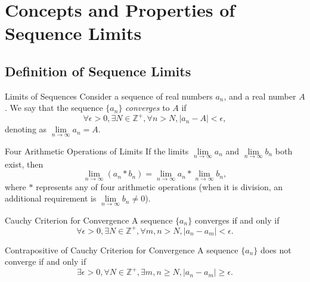 
\section{Concepts and Properties of Sequence Limits}

\subsection{Definition of Sequence Limits}

\begin{definition}{Limits of Sequences}{}
  Consider a sequence of real numbers $a_n$, and a real number $A$.
  We say that the sequence $\{a_n\}$ \emph{converges} to $A$ if
  \begin{equation}
    \forall \epsilon > 0, \exists N \in \mathbb{Z}^+, \forall n > N, |a_n - A| < \epsilon,
  \end{equation}
  denoting as $\lim \limits _{n \rightarrow \infty}a_n = A$.
\end{definition}

\begin{proposition}{Four Arithmetic Operations of Limits}{}
  If the limits $\lim \limits _{n \rightarrow \infty} a_n$ and $\lim \limits _{n \rightarrow \infty} b_n$
  both exist, then
  \begin{equation}
    \lim \limits _{n \rightarrow \infty} (a_n \ast b_n) = \lim \limits _{n \rightarrow \infty} a_n \ast \lim \limits _{n \rightarrow \infty} b_n,
  \end{equation}
  where $\ast$ represents any of four arithmetic operations
  (when it is division, an additional requirement is $\lim \limits _{n
    \rightarrow \infty} b_n \neq 0$).
\end{proposition}

\begin{theorem}{Cauchy Criterion for Convergence}{}
  A sequence $\{a_n\}$ converges if and only if
  \begin{equation}
    \forall \epsilon > 0, \exists N \in \mathbb{Z}^+, \forall m,n > N, |a_n - a_m| < \epsilon.
  \end{equation}
\end{theorem}

\begin{corollary}{Contrapositive of Cauchy Criterion for Convergence}{}
  A sequence $\{a_n\}$ does not converge if and only if
  \begin{equation}
    \exists \epsilon > 0, \forall N \in \mathbb{Z}^+, \exists m, n \geq N, |a_n - a_m| \geq \epsilon.
  \end{equation}
\end{corollary}

